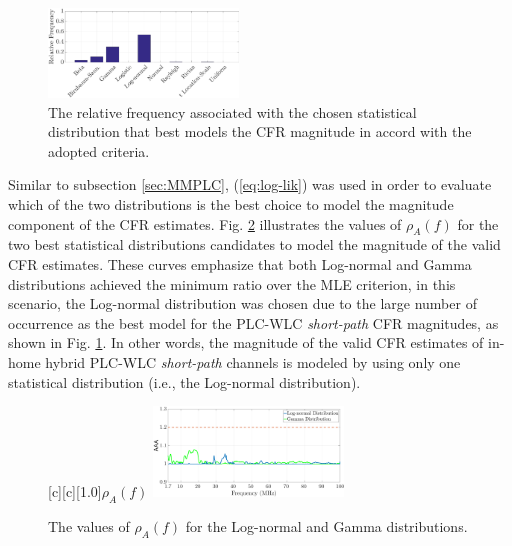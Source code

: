 \documentclass[journal]{IEEEtran}
\begin{document}
\begin{figure}[h!]
	\centering
	\includegraphics[width=0.45\textwidth]{images/MAG_percentsW.eps}
	\caption{The relative frequency associated with the chosen statistical distribution that best models the CFR magnitude in accord with the adopted criteria.}
	\label{MAG_percentsW}
\end{figure}

Similar to subsection \ref{sec:MMPLC}, (\ref{eq:log-lik}) was used in order to evaluate which of the two distributions is the best choice to model the magnitude component of the \ac{CFR} estimates. Fig. \ref{fig:Log_likesW} illustrates the values of  $\rho_{A}(f)$ for the two best statistical distributions candidates to model the magnitude of the valid \ac{CFR} estimates. These curves emphasize that both Log-normal and Gamma distributions achieved the minimum ratio over the \ac{MLE} criterion, in this scenario, the Log-normal distribution was chosen due to the large number of occurrence as the best model for the \ac{PLC}-\ac{WLC} \textit{short-path} \ac{CFR} magnitudes, as shown in Fig. \ref{MAG_percentsW}. In other words, the magnitude of the valid \ac{CFR} estimates of in-home hybrid \ac{PLC}-\ac{WLC} \textit{short-path} channels is modeled by using only one statistical distribution (i.e., the Log-normal distribution).

\begin{figure}[h!]
	\centering
	[c][1.0]{$\rho_{A} (f)$}
	\includegraphics[width=0.45\textwidth]{images/Log_Lognormal_GammasW.eps}
	\caption{The values of $\rho_{A} (f)$ for the Log-normal and Gamma distributions.}
	\label{fig:Log_likesW}
\end{figure}
\end{document}
